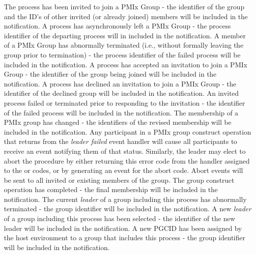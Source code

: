 \begin{constantdesc}
%
The process has been invited to join a \ac{PMIx} Group - the identifier of the group and the ID's of other invited (or already joined) members will be included in the notification.
%
A process has asynchronously left a \ac{PMIx} Group - the process identifier of the departing process will in included in the notification.
%
A member of a \ac{PMIx} Group has abnormally terminated (i.e., without formally leaving the group prior to termination) - the process identifier of the failed process will be included in the notification.
%
A process has accepted an invitation to join a \ac{PMIx} Group - the identifier of the group being joined will be included in the notification.
%
A process has declined an invitation to join a \ac{PMIx} Group - the identifier of the declined group will be included in the notification.
%
An invited process failed or terminated prior to responding to the invitation - the identifier of the failed process will be included in the notification.
%
The membership of a \ac{PMIx} group has changed - the identifiers of the revised membership will be included in the notification.
%
Any participant in a \ac{PMIx} group construct operation that returns  from the \emph{leader failed} event handler will cause all participants to receive an event notifying them of that status. Similarly, the leader may elect to abort the procedure by either returning this error code from the handler assigned to the  or  codes, or by generating an event for the abort code. Abort events will be sent to all invited or existing members of the group.
%
The group construct operation has completed - the final membership will be included in the notification.
%
The current \emph{leader} of a group including this process has abnormally terminated - the group identifier will be included in the notification.
%
A new \emph{leader} of a group including this process has been selected - the identifier of the new leader will be included in the notification.
%
A new \ac{PGCID} has been assigned by the host environment to a group that includes this process - the group identifier will be included in the notification.
%
\end{constantdesc}

